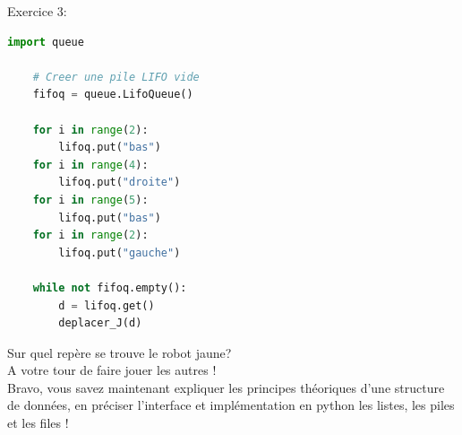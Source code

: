 Exercice 3:
\begin{lstlisting}[language=Python]
    import queue 

    # Creer une pile LIFO vide 
    fifoq = queue.LifoQueue()

    for i in range(2):
        lifoq.put("bas")
    for i in range(4):
        lifoq.put("droite")
    for i in range(5):
        lifoq.put("bas")
    for i in range(2):
        lifoq.put("gauche")

    while not fifoq.empty():
        d = lifoq.get()
        deplacer_J(d)
\end{lstlisting}
Sur quel repère se trouve le robot jaune?\\

A votre tour de faire jouer les autres !\\




Bravo, vous savez maintenant expliquer les principes théoriques d'une structure de données, en préciser l'interface et implémentation en python les listes, les piles et les files ! 

